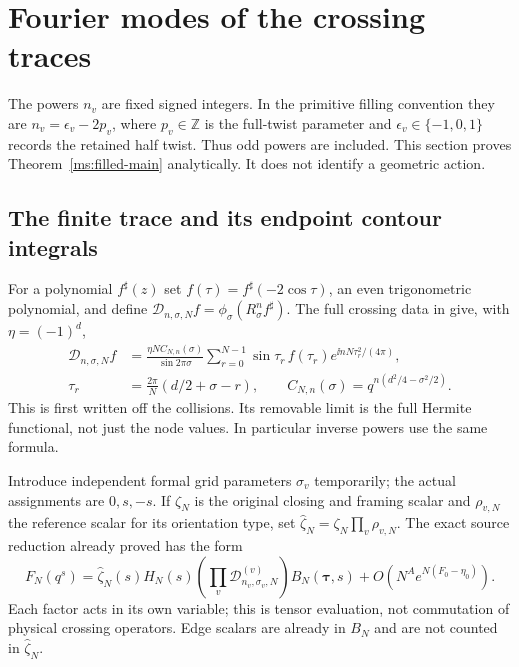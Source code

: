 \section{Fourier modes of the crossing traces}\label{ms:filling}
The powers $n_v$ are fixed signed integers. In the primitive filling
convention they are $n_v=\epsilon_v-2p_v$, where $p_v\in\mathbb Z$
is the full-twist parameter and $\epsilon_v\in\{-1,0,1\}$ records
the retained half twist. Thus odd powers are included.
This section proves Theorem~\ref{ms:filled-main} analytically. It
does not identify a geometric action.

\subsection{The finite trace and its endpoint contour integrals}
For a polynomial $f^\sharp(z)$ set $f(\tau)=f^\sharp(-2\cos\tau)$,
an even trigonometric polynomial, and define
$\mathcal D_{n,\sigma,N}f=\phi_\sigma(R_\sigma^n f^\sharp)$.
The full crossing data in \cite[Proposition 6.1 and equation (6.4)]{Meridian}
give, with $\eta=(-1)^d$,
\begin{align}
 \mathcal D_{n,\sigma,N}f
 &=\frac{\eta N C_{N,n}(\sigma)}{\sin2\pi\sigma}
 \sum_{r=0}^{N-1}\sin\tau_r\,f(\tau_r)
                  e^{\ii nN\tau_r^2/(4\pi)},\label{ms:trace}\\
 \tau_r&=\frac{2\pi}{N}(d/2+\sigma-r),\qquad
 C_{N,n}(\sigma)=q^{n(d^2/4-\sigma^2/2)}.
\end{align}
This is first written off the collisions. Its removable limit is
the full Hermite functional, not just the node values. In
particular inverse powers use the same formula.

Introduce independent formal grid parameters $\sigma_v$ temporarily;
the actual assignments are $0,s,-s$. If $\zeta_N$ is the original
closing and framing scalar and $\rho_{v,N}$ the reference scalar
for its orientation type, set $\widehat\zeta_N=\zeta_N\prod_v\rho_{v,N}$.
The exact source reduction already proved has the form
\begin{equation}\label{ms:source-to-functional}
 F_N(q^s)=\widehat\zeta_N(s)H_N(s)
       \left(\prod_v\mathcal D_{n_v,\sigma_v,N}^{(v)}\right)
       B_N(\boldsymbol\tau,s)
       +O(N^A e^{N(F_0-\eta_0)}).
\end{equation}
Each factor acts in its own variable; this is tensor evaluation,
not commutation of physical crossing operators. Edge scalars are
already in $B_N$ and are not counted in $\widehat\zeta_N$.

